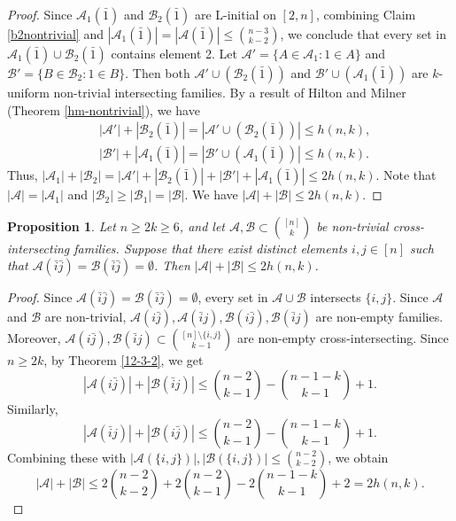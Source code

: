 \documentclass[a4paper,11pt]{article}
\newtheorem{proposition}[theorem]{Proposition}
\newcommand{\m}{\mathcal}
\begin{document}
\begin{proof}
Since $\m A_1(\bar1)$ and $\m B_2(\bar1)$ are L-initial on $[2,n]$, combining Claim \ref{b2nontrivial} and $|\m A_1(\bar 1)|=|\m A(\bar1)|\le {n-3\choose k-2}$, we conclude that every set in $\m A_1(\bar1)\cup \m B_2(\bar1)$
contains element 2. 
Let $\m A'=\{A\in \m A_1: 1\in A\}$ and $\m B'=\{B\in \m B_2: 1\in B\}$.
Then both $\m A' \cup (\m B_2(\bar 1))$ and $\m B' \cup (\m A_1(\bar 1))$ are $k$-uniform non-trivial intersecting families. 
By a result of Hilton and Milner (Theorem \ref{hm-nontrivial}), we have 
\begin{align*}
    &|\m A'|+ |\m B_2(\bar 1)|=|\m A' \cup (\m B_2(\bar 1))|\le h(n,k),\\
    &|\m B'|+ |\m A_1(\bar 1)|=|\m B' \cup (\m A_1(\bar 1))|\le h(n,k).
\end{align*}
Thus, $|\m A_1|+|\m B_2|=|\m A'|+ |\m B_2(\bar 1)|+|\m B'|+ |\m A_1(\bar 1)|\le 2h(n,k)$. 
Note that $|\m A|=|\m A_1|$ and $|\m B_2|\ge |\m B_1|=|\m B|$. 
We have $|\m A|+|\m B|\le 2h(n,k)$.
\end{proof}



\begin{proposition}\label{1-1-1}
Let $n\ge 2k\ge 6$, and let $\mathcal{A}, \mathcal{B} \subset {[n]\choose k}$ be non-trivial cross-intersecting families. 
Suppose that there exist distinct elements $i,j\in [n]$ such that $\mathcal{A}(\bar{i}\bar{j})=\mathcal{B}(\bar{i}\bar{j})=\emptyset$.
Then $|\m A|+|\m B|\le 2h(n,k)$.
\end{proposition}

\begin{proof}
Since $\mathcal{A}(\bar{i}\bar{j})=\mathcal{B}(\bar{i}\bar{j})=\emptyset$, every set in $\m A \cup \m B$ intersects $\{i,j\}$. 
Since $\m A$ and $\m B$ are non-trivial, $\mathcal{A}(i\bar{j}), \mathcal{A}(\bar{i}j), \mathcal{B}(i\bar{j}), \mathcal{B}(\bar{i}j)$ are non-empty families.
Moreover, $\mathcal{A}(i\bar{j}), \mathcal{B}(\bar{i}j)\subset {[n]\setminus \{i,j\}\choose k-1}$ are non-empty cross-intersecting. Since $n\ge 2k$, 
by Theorem \ref{12-3-2}, we get
\[
|\mathcal{A}(i\bar{j})|+|\mathcal{B}(\bar{i}j)|\le {n-2\choose k-1}-{n-1-k\choose k-1}+1.
\]
Similarly, 
\[
 |\mathcal{A}(\bar{i}j)|+|\mathcal{B}(i\bar{j})|\le {n-2\choose k-1}-{n-1-k\choose k-1}+1.
 \]
Combining these with $|\m A(\{i,j\})|,|\m B(\{i,j\})|\le{n-2\choose k-2}$, we obtain
\[
|\mathcal{A}|+|\mathcal{B}|\le 2{n-2\choose k-2}+2{n-2\choose k-1}-2{n-1-k\choose k-1}+2=2h(n,k).
\]
\end{proof}
\end{document}
